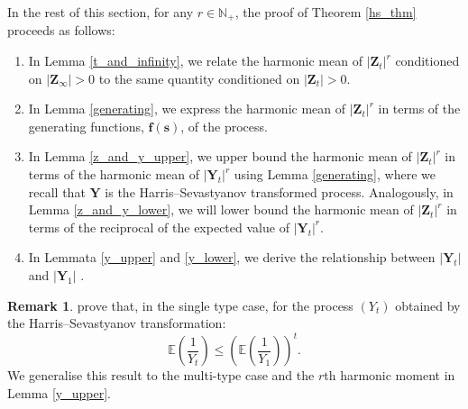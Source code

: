 \documentclass[preprint,3p,12pt]{elsarticle}
\theoremstyle{definition}
\newtheorem*{remark}{Remark}
\begin{document}
In the rest of this section, for any $r \in \mathbb{N}_+$, the proof of Theorem \ref{hs_thm} proceeds as follows:
    \begin{enumerate}
    \item In Lemma \ref{t_and_infinity}, we relate the harmonic mean of $|\boldsymbol{Z}_t|^r$ conditioned on $|\boldsymbol{Z}_{\infty}| >0$ to the same quantity conditioned on $|\boldsymbol{Z}_{t}| >0$. 
    \item In Lemma \ref{generating}, we express the harmonic mean of $|\boldsymbol{Z}_t|^r$ in terms of the generating functions, $\boldsymbol{f}(\boldsymbol{s})$, of the process.
    \item In Lemma \ref{z_and_y_upper}, we upper bound the harmonic mean of $|\boldsymbol{Z}_t|^r$ in terms of the harmonic mean of  $|\boldsymbol{Y}_t|^r$ using Lemma \ref{generating}, where we recall that $\boldsymbol{Y}$ is the Harris--Sevastyanov transformed process. Analogously, in Lemma \ref{z_and_y_lower}, we will lower bound the harmonic mean of $|\boldsymbol{Z}_t|^r$ in terms of the reciprocal of the expected value of $|\boldsymbol{Y}_t|^{r}$.
    \item In Lemmata \ref{y_upper} and \ref{y_lower}, we derive the relationship between $|\boldsymbol{Y}_t|$ and $|\boldsymbol{Y}_1|$ .
\end{enumerate}
\begin{remark}
\cite[Inequalities (22)--(25)]{heyde1971} prove that, in the single type case, for the process $(Y_t)$ obtained by the Harris--Sevastyanov transformation:
\begin{equation*}
    \mathbb{E}\left(\frac{1}{Y_t}\right) \le \left(\mathbb{E}\left(\frac{1}{Y_1}\right)\right)^t.
\end{equation*}
We generalise this result to the multi-type case and the $r$th harmonic moment in Lemma \ref{y_upper}.
\end{remark}
\end{document}
